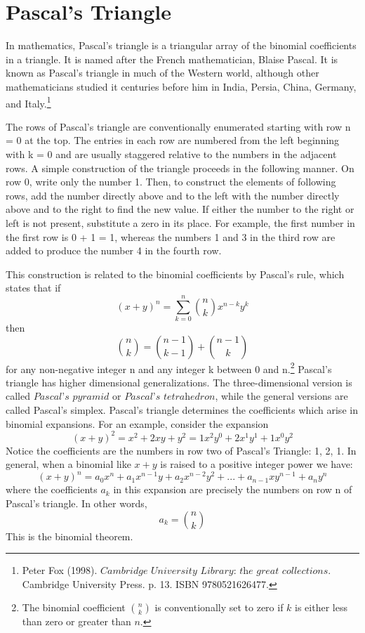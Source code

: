 \documentclass[10pt]{report}
\begin{document}
\section{Pascal's Triangle}
In mathematics, Pascal's triangle is a triangular array of the binomial coefficients in a triangle. It is named after the French mathematician, Blaise Pascal. It is known as Pascal's triangle in much of the Western world, although other mathematicians studied it centuries before him in India, Persia, China, Germany, and Italy.\footnote{Peter Fox (1998). $\textit{Cambridge University Library: the great collections}$. Cambridge University Press. p. 13. ISBN 9780521626477.}

The rows of Pascal's triangle are conventionally enumerated starting with row n = 0 at the top. The entries in each row are numbered from the left beginning with k = 0 and are usually staggered relative to the numbers in the adjacent rows. A simple construction of the triangle proceeds in the following manner. On row 0, write only the number 1. Then, to construct the elements of following rows, add the number directly above and to the left with the number directly above and to the right to find the new value. If either the number to the right or left is not present, substitute a zero in its place. For example, the first number in the first row is 0 + 1 = 1, whereas the numbers 1 and 3 in the third row are added to produce the number 4 in the fourth row.

This construction is related to the binomial coefficients by Pascal's rule, which states that if
$$(x+y)^n=\sum_{k=0}^n{n\choose k}x^{n-k}y^k$$
then
$${n\choose k} = {n-1\choose k-1} + {n-1\choose k}$$
for any non-negative integer n and any integer k between 0 and n.\footnote{The binomial coefficient $\scriptstyle{n \choose k}$ is conventionally set to zero if $k$ is either less than zero or greater than $n$.}
Pascal's triangle has higher dimensional generalizations. The three-dimensional version is called $\textit{Pascal's pyramid}$ or $\textit{Pascal's tetrahedron}$, while the general versions are called Pascal's simplex.
Pascal's triangle determines the coefficients which arise in binomial expansions. For an example, consider the expansion
$$(x+y)^2=x^2+2xy+y^2=1x^2y^0 + 2x^1y^1 + 1x^0y^2 $$
Notice the coefficients are the numbers in row two of Pascal's Triangle: 1, 2, 1. In general, when a binomial like $x+y$ is raised to a positive integer power we have:
$$(x+y)^n= a_0 x^n+ a_1x^{n-1}y + a_2x^{n-2}y^2 + ... + a_{n-1}xy^{n-1} + a_ny^n$$
where the coefficients $a_k$ in this expansion are precisely the numbers on row n of Pascal's triangle. In other words,
$$a_k={n\choose k}$$
This is the binomial theorem.
\end{document}
